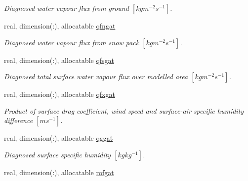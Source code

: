 \begin{DoxyCompactItemize}
\begin{DoxyCompactList}\small\item\em Diagnosed water vapour flux from ground $[kg m^{-2} s^{-1} ]$. \end{DoxyCompactList}\item 
\hypertarget{structclass__statevars_1_1class__gather_ab107aeffffe3048550e6109c4aae7e74}{}real, dimension(\+:), allocatable \hyperlink{structclass__statevars_1_1class__gather_ab107aeffffe3048550e6109c4aae7e74}{qfngat}\label{structclass__statevars_1_1class__gather_ab107aeffffe3048550e6109c4aae7e74}

\begin{DoxyCompactList}\small\item\em Diagnosed water vapour flux from snow pack $[kg m^{-2} s^{-1} ]$. \end{DoxyCompactList}\item 
\hypertarget{structclass__statevars_1_1class__gather_af07fd03d956ef4e4ab954965c9ab2b77}{}real, dimension(\+:), allocatable \hyperlink{structclass__statevars_1_1class__gather_af07fd03d956ef4e4ab954965c9ab2b77}{qfsgat}\label{structclass__statevars_1_1class__gather_af07fd03d956ef4e4ab954965c9ab2b77}

\begin{DoxyCompactList}\small\item\em Diagnosed total surface water vapour flux over modelled area $[kg m^{-2} s^{-1} ]$. \end{DoxyCompactList}\item 
\hypertarget{structclass__statevars_1_1class__gather_a56b3076fe904dbf9f6b2439e5eb702c6}{}real, dimension(\+:), allocatable \hyperlink{structclass__statevars_1_1class__gather_a56b3076fe904dbf9f6b2439e5eb702c6}{qfxgat}\label{structclass__statevars_1_1class__gather_a56b3076fe904dbf9f6b2439e5eb702c6}

\begin{DoxyCompactList}\small\item\em Product of surface drag coefficient, wind speed and surface-\/air specific humidity difference $[m s^{-1} ]$. \end{DoxyCompactList}\item 
\hypertarget{structclass__statevars_1_1class__gather_af065140c495bb1725941b7126336053e}{}real, dimension(\+:), allocatable \hyperlink{structclass__statevars_1_1class__gather_af065140c495bb1725941b7126336053e}{qggat}\label{structclass__statevars_1_1class__gather_af065140c495bb1725941b7126336053e}

\begin{DoxyCompactList}\small\item\em Diagnosed surface specific humidity $[kg kg^{-1} ]$. \end{DoxyCompactList}\item 
\hypertarget{structclass__statevars_1_1class__gather_aabd8f3947bebef8ac38d542aaa353157}{}real, dimension(\+:), allocatable \hyperlink{structclass__statevars_1_1class__gather_aabd8f3947bebef8ac38d542aaa353157}{rofgat}\label{structclass__statevars_1_1class__gather_aabd8f3947bebef8ac38d542aaa353157}


\end{DoxyCompactItemize}
